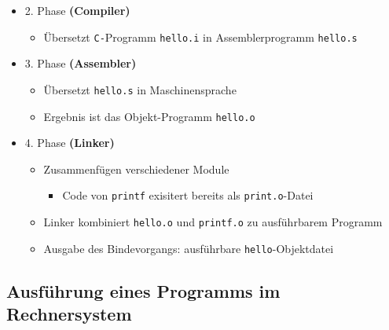 \begin{itemize}
            \item 2. Phase \textbf{(Compiler)}
                \begin{itemize}
                    \item Übersetzt \texttt{C-}Programm \texttt{hello.i} in Assemblerprogramm \texttt{hello.s}
                \end{itemize}
            \item 3. Phase \textbf{(Assembler)}
                \begin{itemize}
                    \item Übersetzt \texttt{hello.s} in Maschinensprache
                    \item Ergebnis ist das Objekt-Programm \texttt{hello.o}
                \end{itemize}
            \item 4. Phase \textbf{(Linker)}
                \begin{itemize}
                    \item Zusammenfügen verschiedener Module
                        \begin{itemize}
                            \item Code von \texttt{printf} exisitert bereits als \texttt{print.o}-Datei
                        \end{itemize}
                    \item Linker kombiniert \texttt{hello.o} und \texttt{printf.o} zu ausführbarem Programm
                    \item Ausgabe des Bindevorgangs: ausführbare \texttt{hello}-Objektdatei
                \end{itemize}
        
        \end{itemize}



\subsection{Ausführung eines Programms im Rechnersystem}
        
